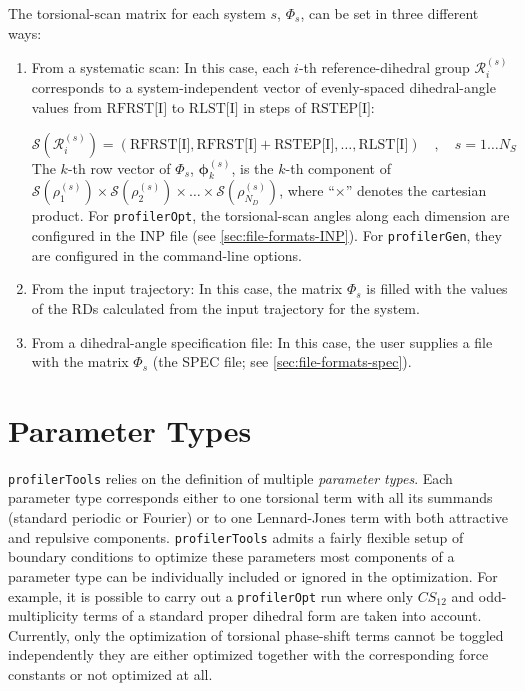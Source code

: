 \documentclass[10pt,a4paper,openany]{memoir}
\numberwithin{equation}{section}
\newcommand{\profileropt}[0]{\texttt{profilerOpt}}
\newcommand{\profilergen}[0]{\texttt{profilerGen}}
\newcommand{\profilertools}[0]{\texttt{profilerTools}}
\begin{document}
The torsional-scan matrix for each system $s$, $\Phi_s$, can
be set in three different ways:
\begin{enumerate}
\item From a systematic scan: In this case, each $i$-th reference-dihedral group
  $\mathcal{R}_i^{(s)}$ corresponds to a system-independent vector of
  evenly-spaced dihedral-angle values from $\text{RFRST[I]}$ to $\text{RLST[I]}$
  in steps of $\text{RSTEP[I]}$:
  
  $$\mathcal{S}(\mathcal{R}_i^{(s)})  = (\text{RFRST[I]}, \text{RFRST[I]} + \text{RSTEP[I]}, \ldots , \text{RLST[I]}) \quad , \quad s=1 \ldots N_S $$
  The $k$-th row vector of $\Phi_s$, $\boldsymbol{\phi}_k^{(s)}$, is the $k$-th
  component of
  $\mathcal{S}({\rho_1^{(s)}}) \times \mathcal{S}({\rho_2^{(s)}}) \times \ldots
  \times \mathcal{S}(\rho_{N_D}^{(s)})$, where ``$\times$'' denotes the
  cartesian product.  For \profileropt{}, the torsional-scan angles along each
  dimension are configured in the INP file (see \autoref{sec:file-formats-INP}).
  For \profilergen{}, they are configured in the command-line options.


\item From the input trajectory: In this case, the matrix $\Phi_s$ is
  filled with the values of the RDs calculated from the input
  trajectory for the system.
\item From a dihedral-angle specification file: In this case, the user
  supplies a file with the matrix $\Phi_s$ (the SPEC file; see
  \autoref{sec:file-formats-spec}).
\end{enumerate}


\section{Parameter Types}
\label{sec:parameter-types}

\profilertools{} relies on the definition of multiple
\textit{parameter types}.
%
Each parameter type corresponds either to one torsional term with all
its summands (standard periodic or Fourier) or to one Lennard-Jones
term with both attractive and repulsive components.
%
\profilertools{} admits a fairly flexible setup of boundary conditions
to optimize these parameters
\textemdash{}
most components of a parameter type can be individually included or
ignored in the optimization.
%
For example, it is possible to carry out a \profileropt{} run where
only $CS_{12}$ and odd-multiplicity terms of a standard proper
dihedral form are taken into account.
%
Currently, only the optimization of torsional phase-shift terms cannot
be toggled independently \textemdash{} they are either optimized
together with the corresponding force constants or not optimized at
all.
\end{document}

